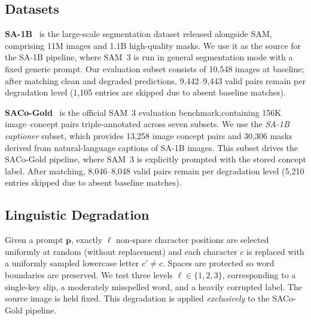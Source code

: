 \documentclass[10pt,twocolumn,letterpaper]{article}
\begin{document}
\subsection{Datasets}
\label{sec:datasets}
  \textbf{SA-1B}~\cite{kirillov2023sam} is the large-scale segmentation dataset released  alongside SAM, comprising 11M images and 1.1B high-quality masks. We use it as the source for the SA-1B pipeline, where SAM~3 is run in general segmentation mode with a fixed generic prompt. Our evaluation subset consists of 10,548 images at baseline; after matching clean and degraded predictions,
  9,442--9,443 valid pairs remain per degradation level (1,105 entries are skipped due to absent baseline matches).


  \textbf{SACo-Gold}~\cite{meta2025saco} is the official SAM~3 evaluation benchmark,containing 156K image--concept pairs triple-annotated across seven subsets. We use the \emph{SA-1B captioner} subset, which provides 13,258 image concept pairs and 30,306 masks derived from natural-language captions of SA-1B images.
  This subset drives the SACo-Gold pipeline, where SAM~3 is explicitly prompted with the stored concept label. After matching, 8,046--8,048 valid pairs remain
  per degradation level (5,210 entries skipped due to absent baseline matches).

\subsection{Linguistic Degradation}
Given a prompt $\mathbf{p}$, exactly $\ell$ non-space character positions are
selected uniformly at random (without replacement) and each character $c$ is replaced with a uniformly sampled lowercase letter $c' \neq c$.  Spaces are
protected so word boundaries are preserved.  We test three levels $\ell \in \{1, 2, 3\}$, corresponding to a single-key slip, a moderately misspelled word, and a heavily corrupted label. The source image is held fixed. This degradation is applied \emph{exclusively} to the SACo-Gold pipeline.
\end{document}

